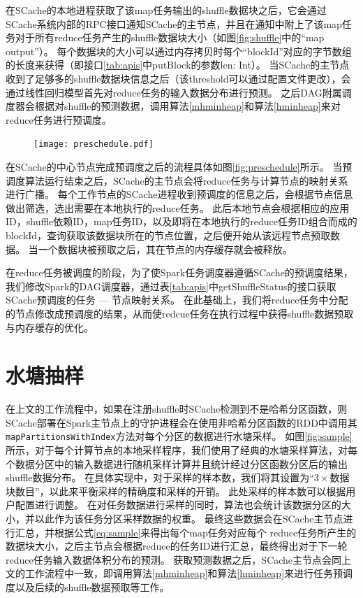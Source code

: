 在SCache的本地进程获取了该map任务输出的shuffle数据块之后，它会通过SCache系统内部的RPC接口通知SCache的主节点，并且在通知中附上了该map任务对于所有reduce任务产生的shuffle数据块大小（如图\ref{fig:shuffle}中的“map output”）。
每个数据块的大小可以通过内存拷贝时每个“blockId”对应的字节数组的长度来获得（即接口\ref{tab:apis}中putBlock的参数len: Int）。
当SCache的主节点收到了足够多的shuffle数据块信息之后（该threshold可以通过配置文件更改），会通过线性回归模型首先对reduce任务的输入数据分布进行预测。
之后DAG附属调度器会根据对shuffle的预测数据，调用算法\ref{mhminheap}和算法\ref{hminheap}来对reduce任务进行预调度。

\begin{figure}[!htp]
	\centering
	\texttt{[image: preschedule.pdf]}
\end{figure}

在SCache的中心节点完成预调度之后的流程具体如图\ref{fig:preschedule}所示。
当预调度算法运行结束之后，SCache的主节点会将reduce任务与计算节点的映射关系进行广播。
每个工作节点的SCache进程收到预调度的信息之后，会根据节点信息做出筛选，选出需要在本地执行的reduce任务。
此后本地节点会根据相应的应用ID，shuffle依赖ID，map任务ID，以及即将在本地执行的reduce任务ID组合而成的blockId，查询获取该数据块所在的节点位置，之后便开始从该远程节点预取数据。
当一个数据块被预取之后，其在节点的内存缓存就会被释放。

在reduce任务被调度的阶段，为了使Spark任务调度器遵循SCache的预调度结果，我们修改Spark的DAG调度器，通过表\ref{tab:apis}中getShuffleStatus的接口获取SCache预调度的任务 --- 节点映射关系。
在此基础上，我们将reduce任务中分配的节点修改成预调度的结果，从而使redcue任务在执行过程中获得shuffle数据预取与内存缓存的优化。

\section{水塘抽样}
\label{sec:sampling}

在上文的工作流程中，如果在注册shuffle时SCache检测到不是哈希分区函数，则SCache部署在Spark主节点上的守护进程会在使用非哈希分区函数的RDD中调用其\verb|mapPartitionsWithIndex|\cite{sparksource}方法对每个分区的数据进行水塘采样。
如图\ref{fig:sample}所示，对于每个计算节点的本地采样程序，我们使用了经典的水塘采样算法\cite{reservoir}，对每个数据分区中的输入数据进行随机采样计算并且统计经过分区函数分区后的输出shuffle数据分布。
在具体实现中，对于采样的样本数，我们将其设置为“$3 \times $数据块数目”，以此来平衡采样的精确度和采样的开销。
此处采样的样本数可以根据用户配置进行调整。
在对任务数据进行采样的同时，算法也会统计该数据分区的大小，并以此作为该任务分区采样数据的权重。
最终这些数据会在SCache主节点进行汇总，并根据公式\ref{eq:sample}来得出每个map任务对应每个
reduce任务所产生的数据块大小，之后主节点会根据reduce的任务ID进行汇总，最终得出对于下一轮reduce任务输入数据体积分布的预测。
获取预测数据之后，SCache主节点会同上文的工作流程中一致，即调用算法\ref{mhminheap}和算法\ref{hminheap}来进行任务预调度以及后续的shuffle数据预取等工作。

